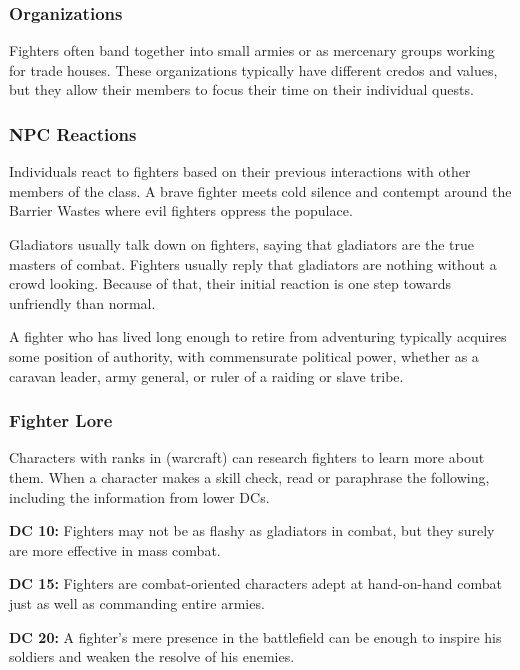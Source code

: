 \subsubsection{Organizations}

Fighters often band together into small armies or as mercenary groups working for trade houses. These organizations typically have different credos and values, but they allow their members to focus their time on their individual quests.

\subsubsection{NPC Reactions}

Individuals react to fighters based on their previous interactions with other members of the class. A brave fighter meets cold silence and contempt around the Barrier Wastes where evil fighters oppress the populace.

Gladiators usually talk down on fighters, saying that gladiators are the true masters of combat. Fighters usually reply that gladiators are nothing without a crowd looking. Because of that, their initial reaction is one step towards unfriendly than normal.

A fighter who has lived long enough to retire from adventuring typically acquires some position of authority, with commensurate political power, whether as a caravan leader, army general, or ruler of a raiding or slave tribe.

\subsubsection{Fighter Lore}

Characters with ranks in  (warcraft) can research fighters to learn more about them. When a character makes a skill check, read or paraphrase the following, including the information from lower DCs.

\textbf{DC 10:} Fighters may not be as flashy as gladiators in combat, but they surely are more effective in mass combat.

\textbf{DC 15:} Fighters are combat-oriented characters adept at hand-on-hand combat just as well as commanding entire armies.

\textbf{DC 20:} A fighter's mere presence in the battlefield can be enough to inspire his soldiers and weaken the resolve of his enemies.
